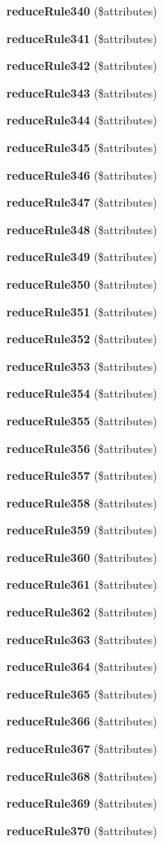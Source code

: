 \begin{DoxyCompactItemize}
\item 
{\bf reduce\+Rule340} (\$attributes)
\item 
{\bf reduce\+Rule341} (\$attributes)
\item 
{\bf reduce\+Rule342} (\$attributes)
\item 
{\bf reduce\+Rule343} (\$attributes)
\item 
{\bf reduce\+Rule344} (\$attributes)
\item 
{\bf reduce\+Rule345} (\$attributes)
\item 
{\bf reduce\+Rule346} (\$attributes)
\item 
{\bf reduce\+Rule347} (\$attributes)
\item 
{\bf reduce\+Rule348} (\$attributes)
\item 
{\bf reduce\+Rule349} (\$attributes)
\item 
{\bf reduce\+Rule350} (\$attributes)
\item 
{\bf reduce\+Rule351} (\$attributes)
\item 
{\bf reduce\+Rule352} (\$attributes)
\item 
{\bf reduce\+Rule353} (\$attributes)
\item 
{\bf reduce\+Rule354} (\$attributes)
\item 
{\bf reduce\+Rule355} (\$attributes)
\item 
{\bf reduce\+Rule356} (\$attributes)
\item 
{\bf reduce\+Rule357} (\$attributes)
\item 
{\bf reduce\+Rule358} (\$attributes)
\item 
{\bf reduce\+Rule359} (\$attributes)
\item 
{\bf reduce\+Rule360} (\$attributes)
\item 
{\bf reduce\+Rule361} (\$attributes)
\item 
{\bf reduce\+Rule362} (\$attributes)
\item 
{\bf reduce\+Rule363} (\$attributes)
\item 
{\bf reduce\+Rule364} (\$attributes)
\item 
{\bf reduce\+Rule365} (\$attributes)
\item 
{\bf reduce\+Rule366} (\$attributes)
\item 
{\bf reduce\+Rule367} (\$attributes)
\item 
{\bf reduce\+Rule368} (\$attributes)
\item 
{\bf reduce\+Rule369} (\$attributes)
\item 
{\bf reduce\+Rule370} (\$attributes)

\end{DoxyCompactItemize}
